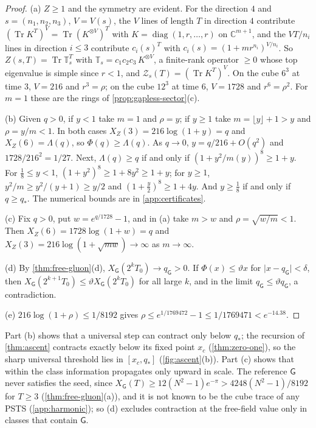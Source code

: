 \documentclass[11pt,a4paper]{amsart}
\theoremstyle{definition}
\theoremstyle{remark}
\numberwithin{equation}{section}
\DeclareMathOperator{\Tr}{Tr}        %
\newcommand{\C}{\mathbb{C}}          %
\newcommand{\abs}[1]{\lvert #1\rvert}      %
\newcommand{\PSTS}{\textup{PSTS}}          %
\newcommand{\TT}{\mathbb{T}}               %
\newcommand{\Zc}{\mathcal{Z}}              %
\newcommand{\Zs}[2]{\Zc_{#1}(#2)}          %
\newcommand{\Vol}[1]{V(#1)}                %
\newcommand{\Gharm}{\mathsf{G}}            %
\newcommand{\xconst}{\frac{1}{8192}}       %
\newcommand{\xconstinl}{1/8192}            %
\begin{document}
\begin{proof}
(a) $Z\ge1$ and the symmetry are evident. For the direction $4$ and $s=(n_1,n_2,n_3)$, $V=\Vol s$, the $V$ lines of length $T$ in direction $4$ contribute $(\Tr K^T)^V=\Tr(K^{\otimes V})^T$ with $K=\operatorname{diag}(1,r,\dots,r)$ on $\C^{m+1}$, and the $VT/n_i$ lines in direction $i\le3$ contribute $c_i(s)^T$ with $c_i(s)=(1+mr^{n_i})^{V/n_i}$. So $Z(s,T)=\Tr\TT_s^T$ with $\TT_s=c_1c_2c_3\,K^{\otimes V}$, a finite-rank operator $\ge0$ whose top eigenvalue is simple since $r<1$, and $\Zs sT=(\Tr K^T)^V$. On the cube $6^3$ at time $3$, $V=216$ and $r^3=\rho$; on the cube $12^3$ at time $6$, $V=1728$ and $r^6=\rho^2$. For $m=1$ these are the rings of \cref{prop:gapless-sector}(c).

(b) Given $q>0$, if $y<1$ take $m=1$ and $\rho=y$; if $y\ge1$ take $m=\lfloor y\rfloor+1>y$ and $\rho=y/m<1$. In both cases $X_Z(3)=216\log(1+y)=q$ and $X_Z(6)=\Lambda(q)$, so $\Phi(q)\ge\Lambda(q)$. As $q\to0$, $y=q/216+O(q^2)$ and $1728/216^2=1/27$. Next, $\Lambda(q)\ge q$ if and only if $(1+y^2/m(y))^8\ge1+y$. For $\frac18\le y<1$, $(1+y^2)^8\ge1+8y^2\ge1+y$; for $y\ge1$, $y^2/m\ge y^2/(y+1)\ge y/2$ and $(1+\frac y2)^8\ge1+4y$. And $y\ge\frac18$ if and only if $q\ge q_*$. The numerical bounds are in \cref{app:certificates}.

(c) Fix $q>0$, put $w=e^{q/1728}-1$, and in (a) take $m>w$ and $\rho=\sqrt{w/m}<1$. Then $X_Z(6)=1728\log(1+w)=q$ and $X_Z(3)=216\log(1+\sqrt{mw})\to\infty$ as $m\to\infty$.

(d) By \cref{thm:free-gluon}(d), $X_\Gharm(2^kT_0)\to q_\Gharm>0$. If $\Phi(x)\le\vartheta x$ for $\abs{x-q_\Gharm}<\delta$, then $X_\Gharm(2^{k+1}T_0)\le\vartheta X_\Gharm(2^kT_0)$ for all large $k$, and in the limit $q_\Gharm\le\vartheta q_\Gharm$, a contradiction.

(e) $216\log(1+\rho)\le\xconstinl$ gives $\rho\le e^{1/1769472}-1\le1/1769471<e^{-14.38}$.
\end{proof}

Part (b) shows that a universal step can contract only below $q_*$; the recursion of \cref{thm:ascent} contracts exactly below its fixed point $x_c$ (\cref{thm:zero-one}), so the sharp universal threshold lies in $[x_c,q_*]$ (\cref{fig:ascent}(b)). Part (c) shows that within the class information propagates only upward in scale. The reference $\Gharm$ never satisfies the seed, since $X_\Gharm(T)\ge12(N^2-1)e^{-\pi}>4248(N^2-1)/8192$ for $T\ge3$ (\cref{thm:free-gluon}(a)), and it is not known to be the cube trace of any \PSTS{} (\cref{app:harmonic}); so (d) excludes contraction at the free-field value only in classes that contain $\Gharm$.
\end{document}
